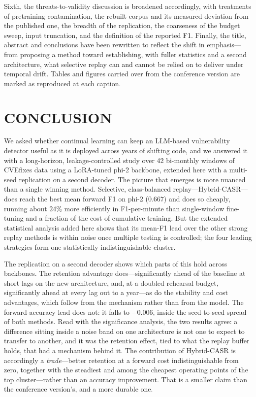 \documentclass[a4paper,twoside]{article}
\begin{document}
Sixth, the threats-to-validity discussion is broadened accordingly, with treatments of pretraining contamination, the rebuilt corpus and its measured deviation from the published one, the breadth of the replication, the coarseness of the budget sweep, input truncation, and the definition of the reported F1. Finally, the title, abstract and conclusions have been rewritten to reflect the shift in emphasis---from proposing a method toward establishing, with fuller statistics and a second architecture, what selective replay can and cannot be relied on to deliver under temporal drift. Tables and figures carried over from the conference version are marked as reproduced at each caption.

\section{\uppercase{Conclusion}}
\label{sec:conclusion}

\noindent
We asked whether continual learning can keep an LLM-based vulnerability detector useful as it is deployed across years of shifting code, and we answered it with a long-horizon, leakage-controlled study over 42 bi-monthly windows of CVEfixes data using a LoRA-tuned phi-2 backbone, extended here with a multi-seed replication on a second decoder. The picture that emerges is more nuanced than a single winning method. Selective, class-balanced replay---Hybrid-CASR---does reach the best mean forward F1 on phi-2 ($0.667$) and does so cheaply, running about $24\%$ more efficiently in F1-per-minute than single-window fine-tuning and a fraction of the cost of cumulative training. But the extended statistical analysis added here shows that its mean-F1 lead over the other strong replay methods is within noise once multiple testing is controlled; the four leading strategies form one statistically indistinguishable cluster.

The replication on a second decoder shows which parts of this hold across backbones. The retention advantage does---significantly ahead of the baseline at short lags on the new architecture, and, at a doubled rehearsal budget, significantly ahead at every lag out to a year---as do the stability and cost advantages, which follow from the mechanism rather than from the model. The forward-accuracy lead does not: it falls to $-0.006$, inside the seed-to-seed spread of both methods. Read with the significance analysis, the two results agree: a difference sitting inside a noise band on one architecture is not one to expect to transfer to another, and it was the retention effect, tied to what the replay buffer holds, that had a mechanism behind it. The contribution of Hybrid-CASR is accordingly a \emph{trade}---better retention at a forward cost indistinguishable from zero, together with the steadiest and among the cheapest operating points of the top cluster---rather than an accuracy improvement. That is a smaller claim than the conference version's, and a more durable one.
\end{document}
